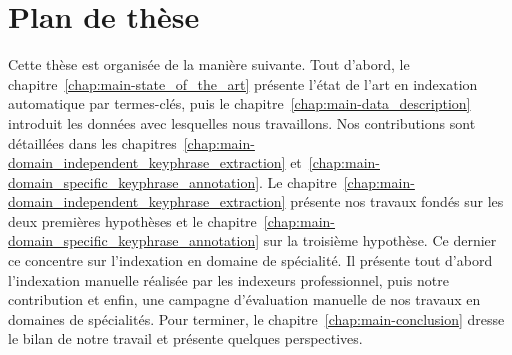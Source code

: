 
  \section{Plan de thèse}
  \label{sec:main-introduction-outline}
    Cette thèse est organisée de la manière suivante. Tout d'abord, le
    chapitre~\ref{chap:main-state_of_the_art} présente l'état de l'art en
    indexation automatique par termes-clés, puis le
    chapitre~\ref{chap:main-data_description} introduit les données avec
    lesquelles nous travaillons. Nos contributions sont détaillées dans les
    chapitres~\ref{chap:main-domain_independent_keyphrase_extraction}
    et~\ref{chap:main-domain_specific_keyphrase_annotation}. Le
    chapitre~\ref{chap:main-domain_independent_keyphrase_extraction} présente
    nos travaux fondés sur les deux premières hypothèses et le
    chapitre~\ref{chap:main-domain_specific_keyphrase_annotation} sur la
    troisième hypothèse. Ce dernier ce concentre sur l'indexation en domaine de
    spécialité. Il présente tout d'abord l'indexation manuelle réalisée par les
    indexeurs professionnel, puis notre contribution et enfin, une campagne
    d'évaluation manuelle de nos travaux en domaines de spécialités. Pour
    terminer, le chapitre~\ref{chap:main-conclusion} dresse le bilan de notre
    travail et présente quelques perspectives.

